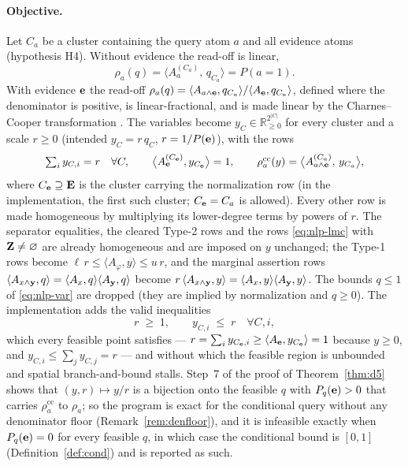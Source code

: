 \documentclass{article} %
\newcommand{\readoff}{\rho}
\providecommand{\readoffcc}{\readoff^{\mathrm{cc}}}
\begin{document}
\paragraph{Objective.}\label{sec:nlp-obj}
Let $C_a$ be a cluster containing the query atom $a$ and all evidence atoms
(hypothesis H4). Without evidence the read-off is linear,
\begin{equation}\label{eq:nlp-obj}
  \readoff_a(q)=\bigl\langle A^{(C_a)}_{a},\,q_{C_a}\bigr\rangle=P(a{=}1).
\end{equation}
With evidence $\mathbf{e}$ the read-off
$\readoff_a(q)=\langle A_{a\wedge\be},q_{C_a}\rangle/\langle A_{\be},q_{C_a}\rangle$,
defined where the denominator is positive, is linear-fractional, and is made
linear by the Charnes--Cooper transformation \citep{charnes1962flp}. The variables
become $y_C\in\mathbb R_{\ge0}^{2^{|C|}}$ for every cluster and a scale $r\ge0$
(intended $y_C=r\,q_C$, $r=1/P(\mathbf{e})$), with the rows
\begin{equation}\label{eq:nlp-obj-ev}
  \textstyle\sum_i y_{C,i}=r\quad\forall C,\qquad
  \bigl\langle A^{(C_{\be})}_{\be},y_{C_{\be}}\bigr\rangle=1,\qquad
  \readoffcc_a(y)=\bigl\langle A^{(C_a)}_{a\wedge\be},\,y_{C_a}\bigr\rangle ,
\end{equation}
where $C_{\mathbf{e}}\supseteq\mathbf{E}$ is the cluster carrying the normalization row (in
the implementation, the first such cluster; $C_{\mathbf{e}}=C_a$ is allowed). Every
other row is made homogeneous by multiplying its lower-degree terms by powers
of $r$. The separator equalities, the cleared Type-2 rows and the rows
\eqref{eq:nlp-lmc} with $\mathbf{Z}\neq\varnothing$ are already homogeneous and are
imposed on $y$ unchanged; the Type-1 rows become
$\ell\,r\le\langle A_\varphi,y\rangle\le u\,r$, and the marginal assertion rows
$\langle A_{x\wedge\mathbf{y}},q\rangle=\langle A_{x},q\rangle\langle A_{\mathbf{y}},q\rangle$ become
$r\,\langle A_{x\wedge\mathbf{y}},y\rangle=\langle A_{x},y\rangle\langle A_{\mathbf{y}},y\rangle$.
The bounds $q\le1$ of \eqref{eq:nlp-var} are dropped (they are implied by
normalization and $q\ge0$). The implementation adds the valid inequalities
\[
  r\;\ge\;1,\qquad y_{C,i}\;\le\;r\quad\forall C,i,
\]
which every feasible point satisfies --- $r=\sum_i y_{C_{\mathbf{e}},i}\ge\langle
A_{\mathbf{e}},y_{C_{\mathbf{e}}}\rangle=1$ because $y\ge0$, and $y_{C,i}\le\sum_j y_{C,j}=r$ ---
and without which the feasible region is unbounded and spatial branch-and-bound
stalls. Step~7 of the proof of Theorem~\ref{thm:d5} shows that $(y,r)\mapsto y/r$
is a bijection onto the feasible $q$ with $P_q(\mathbf{e})>0$ that carries
$\readoffcc_a$ to $\readoff_a$; so the program is exact for the conditional query
without any denominator floor (Remark~\ref{rem:denfloor}), and it is infeasible
exactly when $P_q(\mathbf{e})=0$ for every feasible $q$, in which case the conditional
bound is $[0,1]$ (Definition~\ref{def:cond}) and is reported as such.
\end{document}
